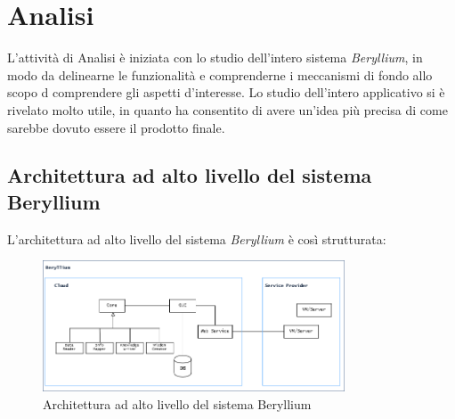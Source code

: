 \section{Analisi}
L'attività di Analisi è iniziata con lo studio dell'intero sistema \emph{Beryllium}, in modo da delinearne le funzionalità e comprenderne i meccanismi di fondo allo scopo d comprendere gli aspetti d'interesse. 
Lo studio dell'intero applicativo si è rivelato molto utile, in quanto ha consentito di avere un’idea più precisa di come sarebbe dovuto essere il prodotto finale.
\subsection{Architettura ad alto livello del sistema Beryllium}

L’architettura ad alto livello del sistema \emph{Beryllium} è così strutturata:
\begin{figure}[H]
    \centering
    \captionsetup{justification=centering,margin=2cm}
        \includegraphics[width=0.8\textwidth ]{figures/analisi1.png}
        \caption [Architettura ad alto livello del sistema Beryllium]{ Architettura ad alto livello del sistema Beryllium \label{fig:architetturasitema}}
\end{figure}

